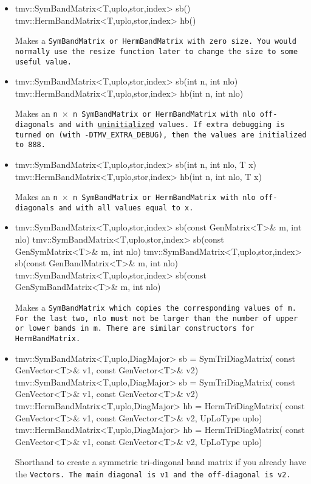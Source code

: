 \begin{itemize}

\item
\begin{tmvcode}
tmv::SymBandMatrix<T,uplo,stor,index> sb()
tmv::HermBandMatrix<T,uplo,stor,index> hb()
\end{tmvcode}
Makes a \tt{SymBandMatrix} or \tt{HermBandMatrix} with zero size.  You would normally use the \tt{resize} function later to
change the size to some useful value.

\item 
\begin{tmvcode}
tmv::SymBandMatrix<T,uplo,stor,index> sb(int n, int nlo)
tmv::HermBandMatrix<T,uplo,stor,index> hb(int n, int nlo)
\end{tmvcode}
Makes an \tt{n} $\times$ \tt{n} \tt{SymBandMatrix} or \tt{HermBandMatrix} with 
\tt{nlo} off-diagonals
and with \underline{uninitialized} values.
If extra debugging is turned on (with \tt{-DTMV\_EXTRA\_DEBUG}), then the values are initialized to 888.

\item
\begin{tmvcode}
tmv::SymBandMatrix<T,uplo,stor,index> sb(int n, int nlo, T x)
tmv::HermBandMatrix<T,uplo,stor,index> hb(int n, int nlo, T x)
\end{tmvcode}
Makes an \tt{n} $\times$ \tt{n} \tt{SymBandMatrix}  or \tt{HermBandMatrix} with \tt{nlo} off-diagonals
and with all values equal to \tt{x}.

\item 
\begin{tmvcode}
tmv::SymBandMatrix<T,uplo,stor,index> sb(const GenMatrix<T>& m, 
      int nlo)
tmv::SymBandMatrix<T,uplo,stor,index> sb(const GenSymMatrix<T>& m, 
      int nlo)
tmv::SymBandMatrix<T,uplo,stor,index> sb(const GenBandMatrix<T>& m, 
      int nlo)
tmv::SymBandMatrix<T,uplo,stor,index> sb(const GenSymBandMatrix<T>& m, 
      int nlo)
\end{tmvcode}
Makes a \tt{SymBandMatrix} which copies the corresponding values of \tt{m}.  
For the last two, \tt{nlo} must not be larger than the number of upper
or lower bands in \tt{m}.  There are similar constructors for \tt{HermBandMatrix}.

\item
\begin{tmvcode}
tmv::SymBandMatrix<T,uplo,DiagMajor> sb = SymTriDiagMatrix(
      const GenVector<T>& v1, const GenVector<T>& v2)
tmv::SymBandMatrix<T,uplo,DiagMajor> sb = SymTriDiagMatrix(
      const GenVector<T>& v1, const GenVector<T>& v2)
tmv::HermBandMatrix<T,uplo,DiagMajor> hb = HermTriDiagMatrix(
      const GenVector<T>& v1, const GenVector<T>& v2, 
      UpLoType uplo)
tmv::HermBandMatrix<T,uplo,DiagMajor> hb = HermTriDiagMatrix(
      const GenVector<T>& v1, const GenVector<T>& v2, 
      UpLoType uplo)
\end{tmvcode}
Shorthand to create a symmetric tri-diagonal band matrix
if you already have the \tt{Vector}s.  
The main diagonal is \tt{v1} and the off-diagonal is \tt{v2}.


\end{itemize}
